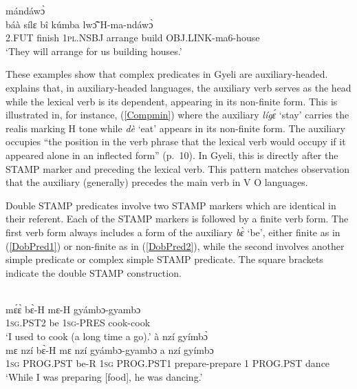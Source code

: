 \begin{exe} 
\ex\label{tempobj2}
   mándáwɔ̀\\
        báà sílɛ bî kúmba lwɔ̃̂ H-ma-ndáwɔ̀ \\
        2.FUT finish 1\textsc{pl}.NSBJ arrange build OBJ.LINK-ma6-house  \\
    \trans `They will arrange for us building houses.'
\end{exe}


These examples show that complex predicates in Gyeli are auxiliary-headed. \citet[9]{anderson2011b} explains that, in auxiliary-headed languages, the auxiliary verb serves as the head while the lexical verb is its dependent,  appearing in its non-finite form. This is illustrated in, for instance, (\ref{Compmin}) where the auxiliary {\itshape lígɛ́} `stay' carries the realis marking H tone while {\itshape dè} `eat' appears in its non-finite form.
The auxiliary occupies ``the position in the verb phrase that the lexical verb would occupy if it appeared alone in an inflected form'' (p.\ 10). In Gyeli, this is directly after the STAMP marker and preceding the lexical verb. This pattern matches  observation that the auxiliary (generally) precedes the main verb in V O languages.

Double STAMP predicates involve two STAMP markers which are identical in their referent. Each of the STAMP markers is followed by a finite verb form. The first verb form always includes a form of the auxiliary {\itshape bɛ̀} `be', either finite as in (\ref{DobPred1}) or non-finite as in (\ref{DobPred2}), while the second involves another simple predicate or complex simple STAMP predicate. The square brackets indicate the double STAMP construction.

\begin{exe}
\ex\label{DobPred}
\begin{xlist}
\ex\label{DobPred1}
   \\
          mɛ́ɛ̀ bɛ̀-H mɛ-H gyámbɔ-gyambɔ \\
              1\textsc{sg}.PST2 be 1\textsc{sg}-PRES cook-cook   \\
    \trans `I used to cook (a long time a go).'
\ex\label{DobPred2}
  à nzí gyímbɔ̀  \\
 mɛ nzí bɛ̀-H mɛ nzí gyámbɔ-gyambɔ a nzí gyímbɔ  \\
              1\textsc{sg} PROG.PST be-R 1\textsc{sg} PROG.PST1 prepare-prepare 1 PROG.PST dance   \\
    \trans `While I was preparing [food], he was dancing.'
\end{xlist}
\end{exe}

